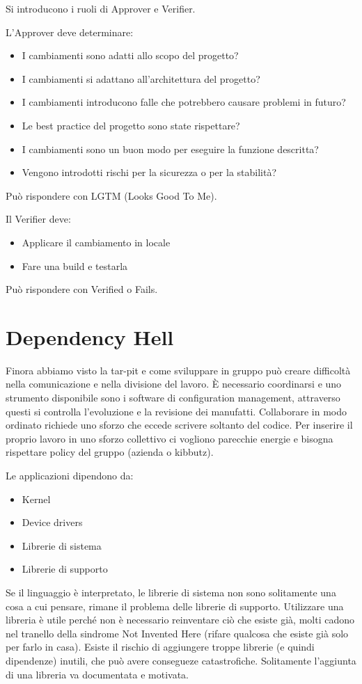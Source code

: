 \documentclass[a4paper,12pt,titlepage,oneside]{book}
\begin{document}
Si introducono i ruoli di Approver e Verifier.

L'Approver deve determinare:
\begin{itemize}
    \item I cambiamenti sono adatti allo scopo del progetto?
    \item I cambiamenti si adattano all'architettura del progetto?
    \item I cambiamenti introducono falle che potrebbero causare problemi in futuro?
    \item Le best practice del progetto sono state rispettare?
    \item I cambiamenti sono un buon modo per eseguire la funzione descritta?
    \item Vengono introdotti rischi per la sicurezza o per la stabilità?
\end{itemize}
Può rispondere con LGTM (Looks Good To Me).

Il Verifier deve:
\begin{itemize}
    \item Applicare il cambiamento in locale
    \item Fare una build e testarla
\end{itemize}
Può rispondere con Verified o Fails.

\chapter{Dependency Hell}
Finora abbiamo visto la tar-pit e come sviluppare in gruppo può creare difficoltà nella comunicazione e nella divisione del lavoro. È necessario coordinarsi e uno strumento disponibile sono i software 
di configuration management, attraverso questi si controlla l'evoluzione e la revisione dei manufatti.
Collaborare in modo ordinato richiede uno sforzo che eccede scrivere soltanto del codice. Per inserire il proprio lavoro in uno sforzo collettivo ci vogliono parecchie energie e bisogna rispettare 
policy del gruppo (azienda o kibbutz).

Le applicazioni dipendono da:
\begin{itemize}
    \item Kernel
    \item Device drivers
    \item Librerie di sistema
    \item Librerie di supporto
\end{itemize}

Se il linguaggio è interpretato, le librerie di sistema non sono solitamente una cosa a cui pensare, rimane il problema delle librerie di supporto.
Utilizzare una libreria è utile perché non è necessario reinventare ciò che esiste già, molti cadono nel tranello della sindrome Not Invented Here (rifare qualcosa che esiste già solo per farlo in casa).
Esiste il rischio di aggiungere troppe librerie (e quindi dipendenze) inutili, che può avere consegueze catastrofiche. Solitamente l'aggiunta di una libreria va documentata e motivata.
\end{document}
